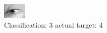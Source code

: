 \begin{figure}[h!]
\begin{center}
\includegraphics[width=0.60\columnwidth]{figures/ID2944_class_3_target_4.png}
\end{center}
\caption{ Classification: 3 actual target: 4}
\label{fig:ID2944_class_3_target_4}
\end{figure}
